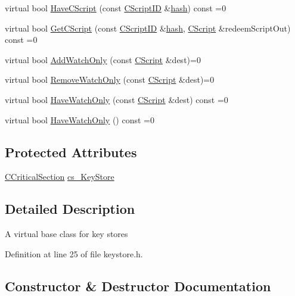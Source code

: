 \begin{DoxyCompactItemize}
virtual bool \hyperlink{class_c_key_store_a51c9fc86b2c3fece10d86146231fa58d}{Have\+C\+Script} (const \hyperlink{class_c_script_i_d}{C\+Script\+I\+D} \&\hyperlink{cache_8cc_a11ecb029164e055f28f4123ce3748862}{hash}) const =0
\item 
virtual bool \hyperlink{class_c_key_store_ae6bf4dbeb0705e199250e48aa5d34264}{Get\+C\+Script} (const \hyperlink{class_c_script_i_d}{C\+Script\+I\+D} \&\hyperlink{cache_8cc_a11ecb029164e055f28f4123ce3748862}{hash}, \hyperlink{class_c_script}{C\+Script} \&redeem\+Script\+Out) const =0
\item 
virtual bool \hyperlink{class_c_key_store_a12cd4eaa01bd4f4231c0bf68425a44af}{Add\+Watch\+Only} (const \hyperlink{class_c_script}{C\+Script} \&dest)=0
\item 
virtual bool \hyperlink{class_c_key_store_ad510747f28d129123a5200e4df8f7f61}{Remove\+Watch\+Only} (const \hyperlink{class_c_script}{C\+Script} \&dest)=0
\item 
virtual bool \hyperlink{class_c_key_store_a15066cfd57feaffe0b9f4103c9311109}{Have\+Watch\+Only} (const \hyperlink{class_c_script}{C\+Script} \&dest) const =0
\item 
virtual bool \hyperlink{class_c_key_store_a9169351f4acf62d299afb824174cbfa8}{Have\+Watch\+Only} () const =0
\end{DoxyCompactItemize}
\subsection*{Protected Attributes}
\begin{DoxyCompactItemize}
\item 
\hyperlink{sync_8h_a37a4692b2d517f2843655ca11af7668a}{C\+Critical\+Section} \hyperlink{class_c_key_store_a386524ff4a00959b81c195cb39fe307d}{cs\+\_\+\+Key\+Store}
\end{DoxyCompactItemize}


\subsection{Detailed Description}
A virtual base class for key stores 

Definition at line 25 of file keystore.\+h.



\subsection{Constructor \& Destructor Documentation}
\hypertarget{class_c_key_store_a9bfaef2bcd6effc467a96043f44044a0}{}
